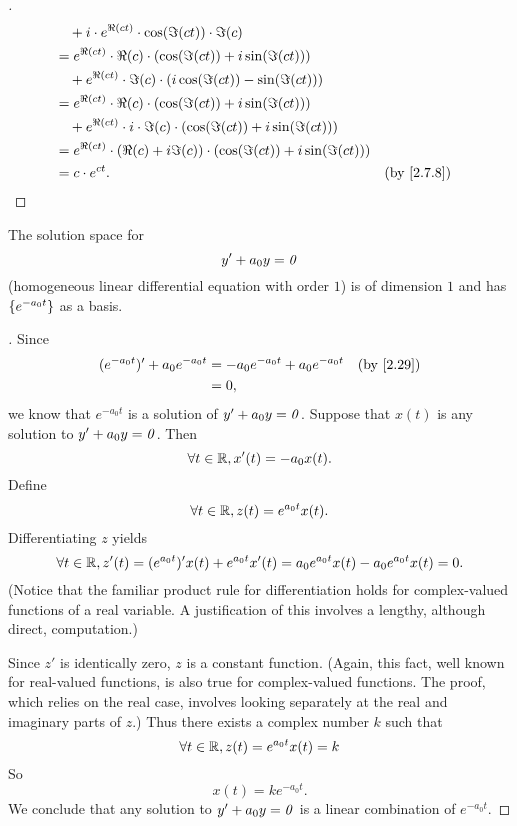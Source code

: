 \begin{proof}[]
\begin{align*}
          & \quad + i \cdot e^{\Re(ct)} \cdot \cos(\Im(ct)) \cdot \Im(c)                                                    \\
          & = e^{\Re(ct)} \cdot \Re(c) \cdot (\cos(\Im(ct)) + i \sin(\Im(ct)))                                              \\
          & \quad + e^{\Re(ct)} \cdot \Im(c) \cdot (i \cos(\Im(ct)) - \sin(\Im(ct)))                                        \\
          & = e^{\Re(ct)} \cdot \Re(c) \cdot (\cos(\Im(ct)) + i \sin(\Im(ct)))                                              \\
          & \quad + e^{\Re(ct)} \cdot i \cdot \Im(c) \cdot (\cos(\Im(ct)) + i \sin(\Im(ct)))                                \\
          & = e^{\Re(ct)} \cdot (\Re(c) + i \Im(c)) \cdot (\cos(\Im(ct)) + i \sin(\Im(ct)))                                 \\
          & = c \cdot e^{ct}.                                                                 &  & \text{(by \cref{2.7.8})}
  \end{align*}
\end{proof}

\begin{thm}\label{2.30}
  The solution space for
  \[
    y' + a_0 y = \mathit{0}
  \]
  (homogeneous linear differential equation with order \(1\)) is of dimension \(1\) and has \(\left\lbrace e^{-a_0 t}\right\rbrace\) as a basis.
\end{thm}

\begin{proof}[]
  Since
  \begin{align*}
    (e^{-a_0 t})' + a_0 e^{-a_0 t} & = -a_0 e^{-a_0 t} + a_0 e^{-a_0 t} &  & \text{(by \cref{2.29})} \\
                                   & = 0,
  \end{align*}
  we know that \(e^{-a_0 t}\) is a solution of \(y' + a_0 y = \mathit{0}\).
  Suppose that \(x(t)\) is any solution to \(y' + a_0 y = \mathit{0}\).
  Then
  \[
    \forall t \in \mathbb{R}, x'(t) = -a_0 x(t).
  \]
  Define
  \[
    \forall t \in \mathbb{R}, z(t) = e^{a_0 t} x(t).
  \]
  Differentiating \(z\) yields
  \[
    \forall t \in \mathbb{R}, z'(t) = (e^{a_0 t})' x(t) + e^{a_0 t} x'(t) = a_0 e^{a_0 t} x(t) - a_0 e^{a_0 t} x(t) = 0.
  \]
  (Notice that the familiar product rule for differentiation holds for complex-valued functions of a real variable.
  A justification of this involves a lengthy, although direct, computation.)

  Since \(z'\) is identically zero, \(z\) is a constant function.
  (Again, this fact, well known for real-valued functions, is also true for complex-valued functions.
  The proof, which relies on the real case, involves looking separately at the real and imaginary parts of \(z\).)
  Thus there exists a complex number \(k\) such that
  \[
    \forall t \in \mathbb{R}, z(t) = e^{a_0 t} x(t) = k
  \]
  So
  \[
    x(t) = k e^{-a_0 t}.
  \]
  We conclude that any solution to \(y' + a_0 y = \mathit{0}\) is a linear combination of \(e^{-a_0 t}\).
\end{proof}

